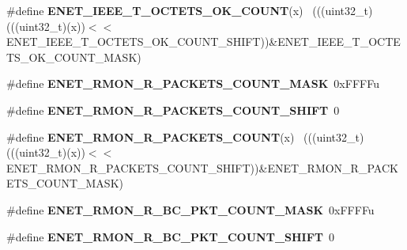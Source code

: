 \begin{DoxyCompactItemize}
\item 
\hypertarget{group___e_n_e_t___register___masks_gae5c5e8c71932559c4f790f8bfc2a40bb}{}\#define {\bfseries E\+N\+E\+T\+\_\+\+I\+E\+E\+E\+\_\+\+T\+\_\+\+O\+C\+T\+E\+T\+S\+\_\+\+O\+K\+\_\+\+C\+O\+U\+N\+T}(x)                  ~(((uint32\+\_\+t)(((uint32\+\_\+t)(x))$<$$<$E\+N\+E\+T\+\_\+\+I\+E\+E\+E\+\_\+\+T\+\_\+\+O\+C\+T\+E\+T\+S\+\_\+\+O\+K\+\_\+\+C\+O\+U\+N\+T\+\_\+\+S\+H\+I\+F\+T))\&E\+N\+E\+T\+\_\+\+I\+E\+E\+E\+\_\+\+T\+\_\+\+O\+C\+T\+E\+T\+S\+\_\+\+O\+K\+\_\+\+C\+O\+U\+N\+T\+\_\+\+M\+A\+S\+K)\label{group___e_n_e_t___register___masks_gae5c5e8c71932559c4f790f8bfc2a40bb}

\item 
\hypertarget{group___e_n_e_t___register___masks_gaffeecf969d5f86c7d84c936ea078e859}{}\#define {\bfseries E\+N\+E\+T\+\_\+\+R\+M\+O\+N\+\_\+\+R\+\_\+\+P\+A\+C\+K\+E\+T\+S\+\_\+\+C\+O\+U\+N\+T\+\_\+\+M\+A\+S\+K}~0x\+F\+F\+F\+Fu\label{group___e_n_e_t___register___masks_gaffeecf969d5f86c7d84c936ea078e859}

\item 
\hypertarget{group___e_n_e_t___register___masks_gaf03a05af7b6a3435e843eef9f55d8bba}{}\#define {\bfseries E\+N\+E\+T\+\_\+\+R\+M\+O\+N\+\_\+\+R\+\_\+\+P\+A\+C\+K\+E\+T\+S\+\_\+\+C\+O\+U\+N\+T\+\_\+\+S\+H\+I\+F\+T}~0\label{group___e_n_e_t___register___masks_gaf03a05af7b6a3435e843eef9f55d8bba}

\item 
\hypertarget{group___e_n_e_t___register___masks_ga68cbd232906768e0f2a4f3239027392d}{}\#define {\bfseries E\+N\+E\+T\+\_\+\+R\+M\+O\+N\+\_\+\+R\+\_\+\+P\+A\+C\+K\+E\+T\+S\+\_\+\+C\+O\+U\+N\+T}(x)                      ~(((uint32\+\_\+t)(((uint32\+\_\+t)(x))$<$$<$E\+N\+E\+T\+\_\+\+R\+M\+O\+N\+\_\+\+R\+\_\+\+P\+A\+C\+K\+E\+T\+S\+\_\+\+C\+O\+U\+N\+T\+\_\+\+S\+H\+I\+F\+T))\&E\+N\+E\+T\+\_\+\+R\+M\+O\+N\+\_\+\+R\+\_\+\+P\+A\+C\+K\+E\+T\+S\+\_\+\+C\+O\+U\+N\+T\+\_\+\+M\+A\+S\+K)\label{group___e_n_e_t___register___masks_ga68cbd232906768e0f2a4f3239027392d}

\item 
\hypertarget{group___e_n_e_t___register___masks_gaea4e90fb7dfef377bdfbd1ec0591c1a9}{}\#define {\bfseries E\+N\+E\+T\+\_\+\+R\+M\+O\+N\+\_\+\+R\+\_\+\+B\+C\+\_\+\+P\+K\+T\+\_\+\+C\+O\+U\+N\+T\+\_\+\+M\+A\+S\+K}~0x\+F\+F\+F\+Fu\label{group___e_n_e_t___register___masks_gaea4e90fb7dfef377bdfbd1ec0591c1a9}

\item 
\hypertarget{group___e_n_e_t___register___masks_gaaadc28d495f1451106da4fcb1e2833ea}{}\#define {\bfseries E\+N\+E\+T\+\_\+\+R\+M\+O\+N\+\_\+\+R\+\_\+\+B\+C\+\_\+\+P\+K\+T\+\_\+\+C\+O\+U\+N\+T\+\_\+\+S\+H\+I\+F\+T}~0\label{group___e_n_e_t___register___masks_gaaadc28d495f1451106da4fcb1e2833ea}


\end{DoxyCompactItemize}
